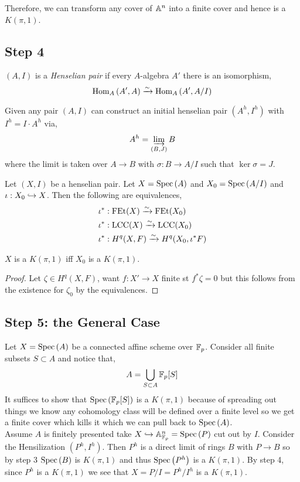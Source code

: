 \documentclass[12pt]{article}
\begin{document}
Therefore, we can transform any \etale cover of $\mathbb{A}^n$ into a finite \etale cover and hence is a $K(\pi, 1)$.

\subsection{Step 4}

\begin{defn}
$(A, I)$ is a \textit{Henselian pair} if every \etale $A$-algebra $A'$ there is an isomorphism,
\[ \mathrm{Hom}_{A} \left( A', A \right) \xrightarrow{\sim} \mathrm{Hom}_{A} \left( A', A/I \right) \]
\end{defn}

\begin{prop}
Given any pair $(A, I)$ can construct an initial henselian pair $(A^h, I^h)$ with $I^h = I \cdot A^h$ via,
\[ A^h = \varinjlim_{(B, J)} B \] 
where the limit is taken over $A \to B$ \etale with $\sigma : B \to A / I$ such that $\ker{\sigma} = J$. 
\end{prop}

\begin{theorem}[Gabber]
Let $(X, I)$ be a henselian pair. Let $X = \mathrm{Spec}\left( A \right)$ and $X_0 = \mathrm{Spec}\left( A/I \right)$ and $\iota : X_0 \hookrightarrow X$. Then the following are equivalences,
\begin{align*}
\iota^* & : \mathrm{FEt}(X) \xrightarrow{\sim} \mathrm{FEt}(X_0)
\\
\iota^* & : \mathrm{LCC}(X) \xrightarrow{\sim} \mathrm{LCC}(X_0)
\\
\iota^* & :H^q(X, F) \xrightarrow{\sim} H^q(X_0, \iota^* F) 
\end{align*}
\end{theorem}

\begin{cor}
$X$ is a $K(\pi, 1)$ iff $X_0$ is a $K(\pi, 1)$.
\end{cor}

\begin{proof}
Let $\zeta \in H^q(X, F)$, want $f : X' \to X$ finite \etale st $f^* \zeta = 0$ but this follows from the existence for $\zeta_0$ by the equivalences. 
\end{proof}

\subsection{Step 5: the General Case}

Let $X = \mathrm{Spec}\left( A \right)$ be a connected affine scheme over $\mathbb{F}_p$. Consider all finite subsets $S \subset A$ and notice that,
\[ A = \bigcup_{S \subset A} \mathbb{F}_p[S] \]
It suffices to show that $\mathrm{Spec}\left( \mathbb{F}_p[S] \right)$ is a $K(\pi, 1)$ because of spreading out things we know any cohomology class will be defined over a finite level so we get a finite \etale cover which kills it which we can pull back to $\mathrm{Spec}\left( A \right)$.
\bigskip\\
Assume $A$ is finitely presented take $X \hookrightarrow \mathbb{A}^n_{\mathbb{F}_p} = \mathrm{Spec}\left( P \right)$ cut out by $I$. Consider the Hensilization $(P^h, I^h)$. Then $P^h$ is a direct limit of rings $B$ with $P \to B$ \etale so by step 3 $\mathrm{Spec}\left( B \right)$ is $K(\pi, 1)$ and thus $\mathrm{Spec}\left( P^h \right)$ is a $K(\pi, 1)$. By step 4, since $P^h$ is a $K(\pi, 1)$ we see that $X = P/I = P^h / I^h$ is a $K(\pi, 1)$.
\end{document}
